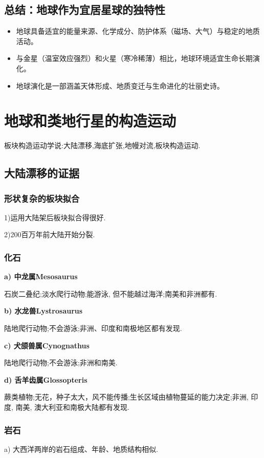 \documentclass[12pt,a4paper]{article}
\begin{document}
	\subsection{总结：地球作为宜居星球的独特性}
	\begin{itemize}
		\item 地球具备适宜的能量来源、化学成分、防护体系（磁场、大气）与稳定的地质活动。
		\item 与金星（温室效应强烈）和火星（寒冷稀薄）相比，地球环境适宜生命长期演化。
		\item 地球演化是一部涵盖天体形成、地质变迁与生命进化的壮丽史诗。
	\end{itemize}
	
	\section{地球和类地行星的构造运动}
	
	板块构造运动学说:大陆漂移,海底扩张,地幔对流,板块构造运动.
	\subsection{大陆漂移的证据}
	\subsubsection{形状复杂的板块拟合}
	1)运用大陆架后板块拟合得很好.
	
	2)200百万年前大陆开始分裂.
	\subsubsection{化石}
	\textbf{a) 中龙属Mesosaurus}
	
	石炭二叠纪;淡水爬行动物;能游泳, 但不能越过海洋;南美和非洲都有.
	
	\textbf{b) 水龙兽Lystrosaurus}
	
 	陆地爬行动物;不会游泳;非洲、印度和南极地区都有发现.
 	
	\textbf{c) 犬颌兽属Cynognathus}
	
	陆地爬行动物;不会游泳;非洲和南美.
	
	\textbf{d) 舌羊齿属Glossopteris}
	
	蕨类植物;无花，种子太大，风不能传播;生长区域由植物蔓延的能力决定;非洲, 印度, 南美, 澳大利亚和南极大陆都有发现.
	
	\subsubsection{岩石}
	a) 大西洋两岸的岩石组成、年龄、地质结构相似.
	
\end{document}
